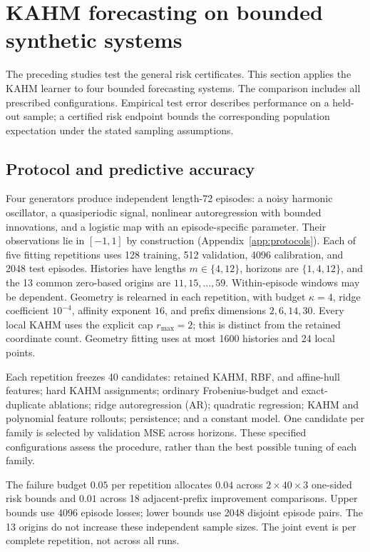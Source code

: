 \section{KAHM forecasting on bounded synthetic systems}
\label{sec:experiments}

The preceding studies test the general risk certificates. This section applies
the KAHM learner to four bounded forecasting systems. The comparison includes
all prescribed configurations. Empirical test error describes performance on
a held-out sample; a certified risk endpoint bounds the corresponding
population expectation under the stated sampling assumptions.

\subsection{Protocol and predictive accuracy}

Four generators produce independent length-72 episodes: a noisy harmonic
oscillator, a quasiperiodic signal, nonlinear autoregression with bounded
innovations, and a logistic map with an episode-specific parameter. Their
observations lie in $[-1,1]$ by construction
(Appendix~\ref{app:protocols}). Each of five fitting repetitions uses 128
training, 512 validation, 4096 calibration, and 2048 test episodes. Histories
have lengths $m\in\{4,12\}$, horizons are $\{1,4,12\}$, and the 13 common
zero-based origins are $11,15,\ldots,59$. Within-episode windows may be
dependent. Geometry is relearned in each repetition, with budget $\kappa=4$,
ridge coefficient $10^{-4}$, affinity exponent $16$, and prefix dimensions
$2,6,14,30$. Every local KAHM uses the explicit cap $r_{\max}=2$;
this is distinct from the retained coordinate count. Geometry fitting uses
at most 1600 histories and 24 local points.

Each repetition freezes 40 candidates: retained KAHM, RBF, and affine-hull
features; hard KAHM assignments; ordinary Frobenius-budget and exact-duplicate
ablations; ridge autoregression (AR); quadratic regression; KAHM and polynomial
feature rollouts; persistence; and a constant model. One candidate per family
is selected by validation MSE across horizons. These specified configurations
assess the procedure, rather than the best possible tuning of each family.

The failure budget $0.05$ per repetition allocates $0.04$ across
$2\times40\times3$ one-sided risk bounds and $0.01$ across 18 adjacent-prefix
improvement comparisons. Upper bounds use 4096 episode losses; lower bounds
use 2048 disjoint episode pairs. The 13 origins do not increase these independent
sample sizes. The joint event is per complete repetition, not across all runs.

